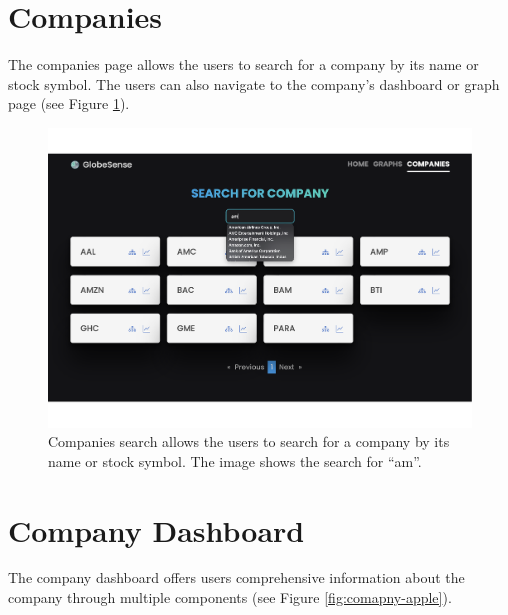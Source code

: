 \newpage

\section{Companies}
\label{sec:user-documentation-companies}
The companies page allows the users to search for a company by its name or stock symbol. The users can also navigate to the company's dashboard or graph page (see Figure \ref{fig:user-documentation-companies-search}).

\begin{figure}[htbp]
    \centering
    \includegraphics[width=\textwidth]{img/user/search-am-a.pdf}
    \caption{Companies search allows the users to search for a company by its name or stock symbol. The image shows the search for ``am''.}
    \label{fig:user-documentation-companies-search}
\end{figure}

\newpage

\section{Company Dashboard}
\label{sec:user-documentation-company-dashboard}
The company dashboard offers users comprehensive information about the company through multiple components (see Figure \ref{fig:comapny-apple}).

